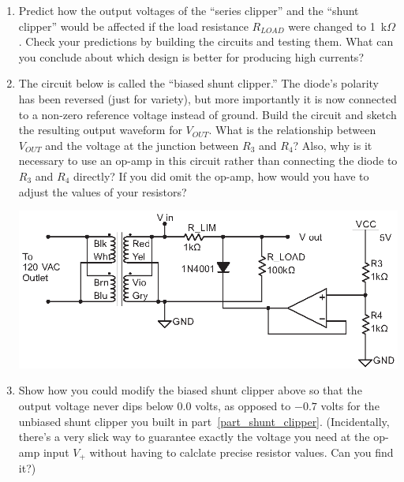 \begin{enumerate}[wide]
\item Predict how the output voltages of the ``series clipper'' and the ``shunt clipper'' would be affected if the load resistance $R_{LOAD}$  were changed to 1~k$\Omega$.  Check your predictions by building the circuits and testing them. What can you conclude about which design is better for producing high currents?  

\item The circuit below is called the ``biased shunt clipper.''  The diode's polarity has been reversed (just for variety), but more importantly it is now connected to a non-zero reference voltage instead of ground.  Build the circuit and sketch the resulting output waveform for $V_{OUT}$.  What is the relationship between $V_{OUT}$ and the voltage at the junction between $R_3$ and $R_4$?  Also, why is it necessary to use an op-amp in this circuit rather than connecting the diode to $R_3$ and $R_4$ directly?  If you did omit the op-amp, how would you have to adjust the values of your resistors?
\label{part_biased_shunt_clipper}
\begin{center}
\includegraphics{diodes/biased_shunt_clipper2.eps}
\end{center} 

\item Show how you could modify the biased shunt clipper above so that the output voltage never dips below 0.0 volts, as opposed to $-0.7$ volts for the unbiased shunt clipper you built in part~\ref{part_shunt_clipper}.   (Incidentally, there's a very slick way to guarantee exactly the voltage you need at the op-amp input $V_+$ without having to calclate precise resistor values.  Can you find it?)  \label{part_biased_clipper_zero}


\end{enumerate}
